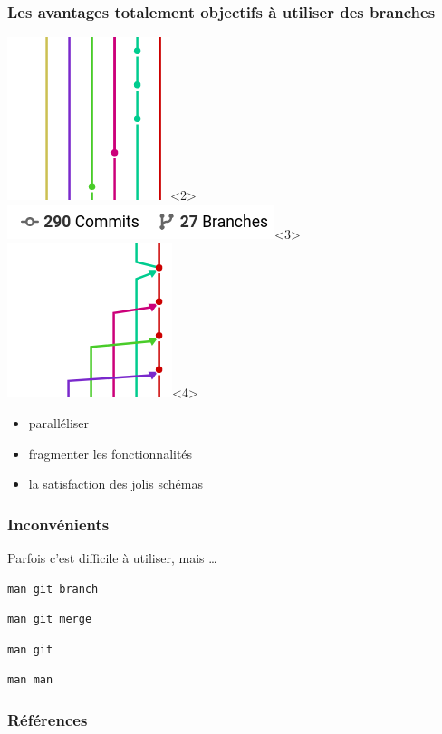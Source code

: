 \documentclass{beamer}
\begin{document}
\begin{frame}
\frametitle{Les avantages totalement objectifs à utiliser des branches}
\includegraphics[scale=.5]{paralleles}<2>
\includegraphics[scale=.3]{stats}<3>
\includegraphics[scale=.3]{merge}<4>
\begin{itemize}
    \item<2-> paralléliser
    \item<3-> fragmenter les fonctionnalités
    \item<4-> la satisfaction des jolis schémas
\end{itemize}
\end{frame}

\begin{frame}[fragile]
\frametitle{Inconvénients}
\pause
Parfois c'est difficile à utiliser\pause, mais \ldots
\begin{verbatim}
man git branch
\end{verbatim}
\pause
\begin{verbatim}
man git merge
\end{verbatim}
\pause
\begin{verbatim}
man git
\end{verbatim}
\pause
\begin{verbatim}
man man
\end{verbatim}
\end{frame}

\begin{frame}
\frametitle{Références}
\printbibliography
\end{frame}
\end{document}
